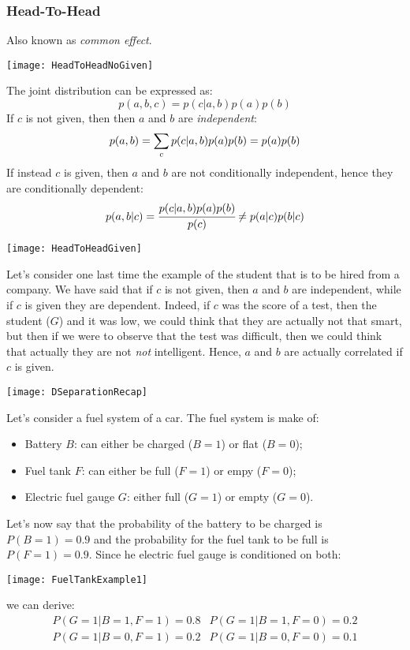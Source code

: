 \subsubsection{Head-To-Head}
Also known as \textit{common effect}.
\begin{center}
	\texttt{[image: HeadToHeadNoGiven]}  
\end{center}
The joint distribution can be expressed as:
\[
  p(a,b,c)=p(c\vert a, b)p(a)p(b)
\]
If $c$ is not given, then then $a$ and $b$ are \textit{independent}:
\[
  p(a,b)=\displaystyle\sum_cp(c\vert a, b)p(a)p(b)=p(a)p(b)
\]
If instead $c$ is given, then $a$ and $b$ are not conditionally independent, hence they are conditionally dependent:
\[
p(a,b\vert c)=\cfrac{p(c\vert a,b)p(a)p(b)}{p(c)}\neq p(a\vert c)p(b\vert c)
\]
\begin{center}
  \texttt{[image: HeadToHeadGiven]}
\end{center}
Let's consider one last time the example of the student that is to be hired from a company. We have said that if $c$ is not given, then $a$ and $b$ are independent, while if $c$ is given they are dependent. Indeed, if $c$ was the score of a test, then the student ($G$) and it was low, we could think that they are actually not that smart, but then if we were to observe that the test was difficult, then we could think that actually they are not \textit{not} intelligent. Hence, $a$ and $b$ are actually correlated if $c$ is given. 
\begin{center}
  \texttt{[image: DSeparationRecap]}
\end{center}
Let's consider a fuel system of a car. The fuel system is make of:
\begin{itemize}
  \item Battery $B$: can either be charged ($B=1$) or flat ($B=0$);
  \item Fuel tank $F$: can either be full ($F=1$) or empy ($F=0$);
  \item Electric fuel gauge $G$: either full ($G=1$) or empty ($G=0$).
\end{itemize}
Let's now say that the probability of the battery to be charged is $P(B=1)=0.9$ and the probability for the fuel tank to be full is $P(F=1)=0.9$. \newline
Since he electric fuel gauge is conditioned on both:
\begin{center}
  \texttt{[image: FuelTankExample1]}
\end{center}
we can derive:
\[
  \begin{array}{ll}
    P(G=1\vert B=1,F=1)=0.8&P(G=1\vert B=1,F=0)=0.2\\
    P(G=1\vert B=0,F=1)=0.2&P(G=1\vert B=0,F=0)=0.1\\
  \end{array}
\]



